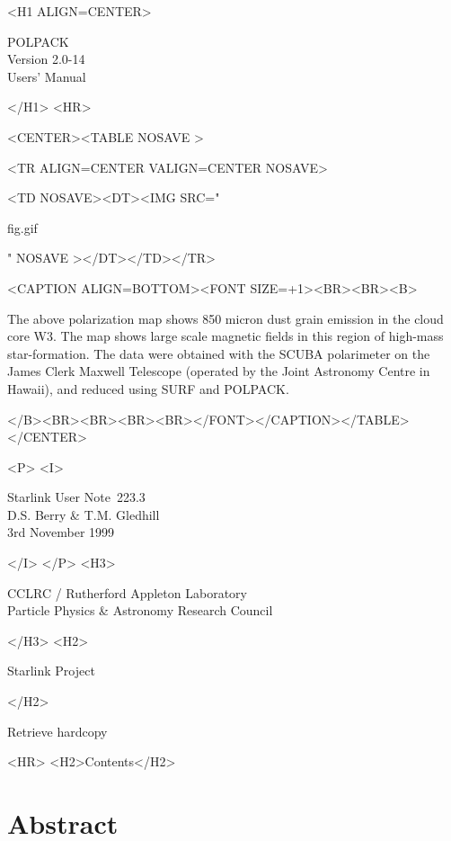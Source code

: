 \documentclass[twoside,11pt]{article}
\newcommand{\stardoccategory}  {Starlink User Note}
\newcommand{\stardocsource}    {sun\stardocnumber}
\newcommand{\stardocnumber}    {223.3}
\newcommand{\stardocauthors}   {D.S. Berry \& T.M. Gledhill }
\newcommand{\stardocdate}      {3rd November 1999}
\newcommand{\stardoctitle}     {POLPACK}
\newcommand{\stardocversion}   {Version 2.0-14}
\newcommand{\stardocmanual}    {Users' Manual}
\newcommand{\htmladdnormallink}[2]{#1}
\newcommand{\htmladdimg}[1]{}
\newcommand{\htmlref}[2]{#1}
\newcommand{\htmladdtonavigation}[1]{}
\newcommand{\xlabel}[1]{}
\renewcommand{\_}{\texttt{\symbol{95}}}
\newcommand{\htmlfig}[3]{
   \label{#1}
   \begin{rawhtml} <CENTER><TABLE NOSAVE > \end{rawhtml}
   \begin{rawhtml} <TR ALIGN=CENTER VALIGN=CENTER NOSAVE> \end{rawhtml}
   \begin{rawhtml} <TD NOSAVE><DT><IMG SRC=" \end{rawhtml}
   #2
   \begin{rawhtml} " NOSAVE ></DT></TD></TR> \end{rawhtml}
   \begin{rawhtml} <CAPTION ALIGN=BOTTOM><FONT SIZE=+1><BR><BR><B> \end{rawhtml}
   #3 
   \begin{rawhtml} </B><BR><BR><BR><BR></FONT></CAPTION></TABLE></CENTER> \end{rawhtml}
}
\begin{document}
\begin{htmlonly}
   \xlabel{}
   \begin{rawhtml} <H1 ALIGN=CENTER> \end{rawhtml}
      \stardoctitle\\
      \stardocversion\\
      \stardocmanual
   \begin{rawhtml} </H1> <HR> \end{rawhtml}

   \htmlfig{map2}{fig.gif}{The above polarization map shows 
   850 micron dust grain emission in the cloud core W3. The map shows large 
   scale magnetic fields in this region of high-mass star-formation. The 
   data were obtained with the SCUBA polarimeter on the James Clerk Maxwell 
   Telescope  (operated by the Joint Astronomy Centre in Hawaii), and 
   reduced using SURF and POLPACK.}

   \begin{rawhtml} <P> <I> \end{rawhtml}
   \stardoccategory\ \stardocnumber \\
   \stardocauthors \\
   \stardocdate
   \begin{rawhtml} </I> </P> <H3> \end{rawhtml}
      \htmladdnormallink{CCLRC}{http://www.cclrc.ac.uk} /
      \htmladdnormallink{Rutherford Appleton Laboratory}
                        {http://www.cclrc.ac.uk/ral} \\
      \htmladdnormallink{Particle Physics \& Astronomy Research Council}
                        {http://www.pparc.ac.uk} \\
   \begin{rawhtml} </H3> <H2> \end{rawhtml}
      \htmladdnormallink{Starlink Project}{http://www.starlink.rl.ac.uk/}
   \begin{rawhtml} </H2> \end{rawhtml}
   \htmladdnormallink{\htmladdimg{source.gif} Retrieve hardcopy}
      {http://www.starlink.rl.ac.uk/cgi-bin/hcserver?\stardocsource}\\

  \label{stardoccontents}
  \begin{rawhtml} 
    <HR>
    <H2>Contents</H2>
  \end{rawhtml}
  \htmladdtonavigation{\htmlref{\htmladdimg{contents_motif.gif}}
        {stardoccontents}}

  \section{\xlabel{abstract}Abstract}
\end{htmlonly}
\end{document}
